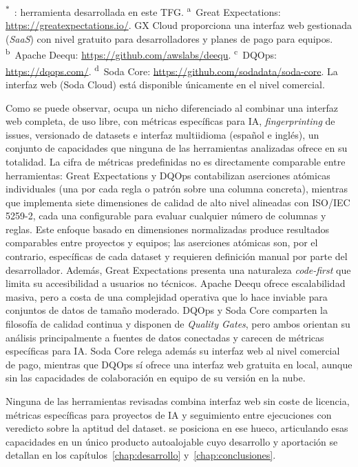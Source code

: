 \begin{table}[htbp]
\begin{tabularx}{\textwidth}{X c c c c c}
    \bottomrule
  \end{tabularx}
  \medskip\par\footnotesize\raggedright
  \textsuperscript{$\ast$}~\dataqual: herramienta desarrollada en este \ac{TFG}.
  \textsuperscript{a}~Great Expectations: \url{https://greatexpectations.io/}. GX Cloud proporciona una interfaz web gestionada (\emph{SaaS}) con nivel gratuito para desarrolladores y planes de pago para equipos.
  \textsuperscript{b}~Apache Deequ: \url{https://github.com/awslabs/deequ}.
  \textsuperscript{c}~DQOps: \url{https://dqops.com/}.
  \textsuperscript{d}~Soda Core: \url{https://github.com/sodadata/soda-core}. La interfaz web (Soda Cloud) está disponible únicamente en el nivel comercial.
\end{table}

Como se puede observar, \dataqual ocupa un nicho diferenciado al combinar una
interfaz web completa, de uso libre, con métricas específicas para
\ac{IA}, \emph{fingerprinting} de issues, versionado de datasets e
interfaz multiidioma (español e inglés), un conjunto de capacidades que
ninguna de las herramientas analizadas ofrece en su totalidad.  La cifra de métricas predefinidas no es directamente comparable entre
herramientas: Great Expectations y DQOps contabilizan aserciones atómicas
individuales (una por cada regla o patrón sobre una columna concreta),
mientras que \dataqual implementa siete dimensiones de calidad de alto nivel
alineadas con \ac{ISO}/\ac{IEC} 5259-2, cada una configurable para evaluar
cualquier número de columnas y reglas. Este enfoque basado en dimensiones
normalizadas produce resultados comparables entre proyectos y equipos;
las aserciones atómicas son, por el contrario, específicas de cada dataset
y requieren definición manual por parte del desarrollador. Además, Great
Expectations presenta una naturaleza \emph{code-first} que limita su
accesibilidad a usuarios no técnicos.  Apache Deequ ofrece escalabilidad masiva, pero a costa de una
complejidad operativa que lo hace inviable para conjuntos de datos de tamaño
moderado.  DQOps y Soda Core comparten la filosofía de calidad continua y disponen de
\emph{Quality Gates}, pero ambos orientan su análisis principalmente a fuentes
de datos conectadas y carecen de métricas específicas para \ac{IA}. Soda Core
relega además su interfaz web al nivel comercial de pago, mientras que DQOps
sí ofrece una interfaz web gratuita en local, aunque sin las capacidades de
colaboración en equipo de su versión en la nube.

Ninguna de las herramientas revisadas combina interfaz web sin coste de
licencia, métricas específicas para proyectos de \ac{IA} y seguimiento entre
ejecuciones con veredicto sobre la aptitud del dataset. \dataqual se posiciona
en ese hueco, articulando esas capacidades en un único producto autoalojable
cuyo desarrollo y aportación se detallan en los
capítulos~\ref{chap:desarrollo} y~\ref{chap:conclusiones}.

